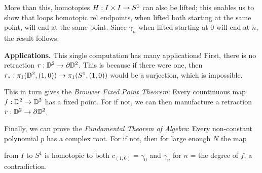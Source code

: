 \documentclass[12pt]{article}
\begin{document}
\ssk

More than this, homotopies $H:I\times I\rightarrow S^1$ can also be lifted; this enables us to
show that loops homotopic rel endpoints, when lifted both starting at the same point,
will end at the same point. Since $\gamma_n$ when lifted starting at $0$ will
end at $n$, the result follows.

\msk

{\bf Applications.}
This single computation has many applications! First, there is no
retraction $r:{\mathbb D}^2\rightarrow \partial{\mathbb D}^2$. This is because if there were one,
then $r_*:\pi_1({\mathbb D}^2,(1,0))\rightarrow\pi_1(S^1,(1,0))$ would be a surjection,
which is impossible.

\ssk

This in turn gives the {\it Brouwer Fixed Point Theorem}: Every countinuous
map $f:{\mathbb D}^2\rightarrow {\mathbb D}^2$ has a fixed point. For if not, we can then 
manufacture a retraction $r:{\mathbb D}^2\rightarrow \partial{\mathbb D}^2$.

\ssk

Finally, we can prove the {\it Fundamental Theorem of Algebra}: Every non-constant
polynomial $p$ has a complex root. For if not, then for large enough $N$ the map


from 
$I$ to $S^1$ is homotopic to both $c_{(1,0)}=\gamma_0$ and $\gamma_n$ for $n$ = the
degree of $f$, a contradiction.

\vfill
\end{document}
